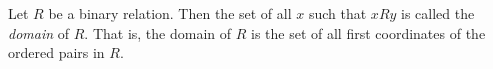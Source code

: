 \documentclass{article}
\begin{document}
Let $R$ be a binary relation.  Then the set of all $x$ such that $x R y$ is called the \emph{domain} of $R$.  That is, the domain of $R$ is the set of all first coordinates of the ordered pairs in $R$.
\end{document}

